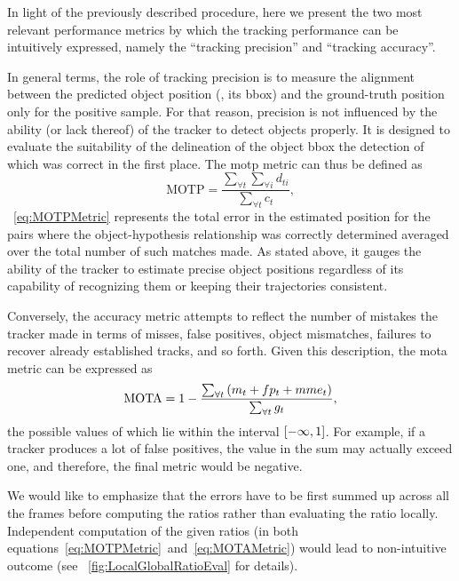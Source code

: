In light of the previously described procedure, here we present the two most relevant performance metrics by which the tracking performance can be intuitively expressed, namely the ``tracking precision'' and ``tracking accuracy''.

In general terms, the role of tracking precision is to measure the alignment between the predicted object position (\egtext{}, its \gls{bbox}) and the ground-truth position only for the positive sample. For that reason, precision is not influenced by the ability (or lack thereof) of the tracker to detect objects properly. It is designed to evaluate the suitability of the delineation of the object \gls{bbox} the detection of which was correct in the first place. The \gls{motp} metric can thus be defined as
\begin{equation}
    \label{eq:MOTPMetric}
    \text{MOTP} = \frac{\sum_{\forall t} \sum_{\forall i} d_{ti}}{\sum_{\forall t} c_t},
\end{equation}
\eqtext{}~\ref{eq:MOTPMetric} represents the total error in the estimated position for the pairs where the object-hypothesis relationship was correctly determined averaged over the total number of such matches made. As stated above, it gauges the ability of the tracker to estimate precise object positions regardless of its capability of recognizing them or keeping their trajectories consistent.

Conversely, the accuracy metric attempts to reflect the number of mistakes the tracker made in terms of misses, false positives, object mismatches, failures to recover already established tracks, and so forth. Given this description, the \gls{mota} metric can be expressed as
\begin{equation}
    \label{eq:MOTAMetric}
    \text{MOTA} = 1 - \frac{\sum_{\forall t} \left( {m_t + fp_t + mme_t} \right)}{\sum_{\forall t} g_t},
\end{equation}
the possible values of which lie within the interval $\left[ {-\infty, 1} \right]$. For example, if a tracker produces a lot of false positives, the value in the sum may actually exceed one, and therefore, the final metric would be negative.

We would like to emphasize that the errors have to be first summed up across all the frames before computing the ratios rather than evaluating the ratio locally. Independent computation of the given ratios (in both equations~\ref{eq:MOTPMetric}~and~\ref{eq:MOTAMetric}) would lead to non-intuitive outcome (see \figtext{}~\ref{fig:LocalGlobalRatioEval} for details).

